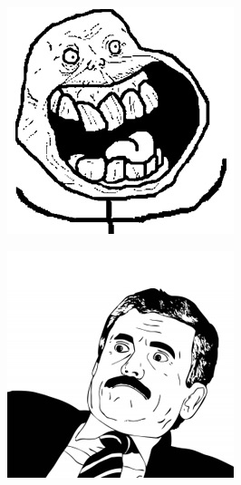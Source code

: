 \begin{multicols}{8}
\begin{center}
\includegraphics[width=\linewidth]{./IMG-GIT/MEMES/Meme-Faces-33.jpg} 
\end{center}

\begin{center}
\includegraphics[width=\linewidth]{./IMG-GIT/MEMES/Meme-Faces-42.jpg}  
\end{center}


\end{multicols}
